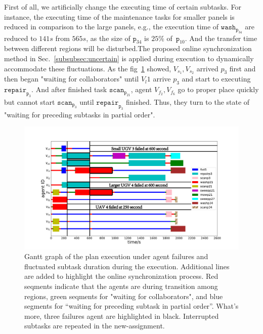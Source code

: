 First of all, we artificially change the executing time of certain subtasks.
For instance, the executing time of the maintenance tasks for smaller panels
is reduced in comparison to the large panels, e.g., the execution time
of $\texttt{wash}_{\texttt{p}_{34}}$ are reduced to $141s$ from $565s$, as the size
of $\texttt{p}_{34}$ is $25\%$ of~$\texttt{p}_{10}$. And the transfer time 
between different regions will be disturbed.The proposed online synchronization method in
 Sec.~\ref{subsubsec:uncertain} is applied during execution to dynamically accommodate these fluctuations.
As the fig~\ref{fig:online-failure-task} showed, $V_{s_1}, V_{s_2}$ arrived $p_3$ first
and then began "waiting for collaborators" until $V_l1$ arrive $p_3$ and start to executing
  $\texttt{repair}_{\texttt{p}_3}$. And after finished task $\texttt{scan}_{\texttt{p}_{21}}$,
  agent $V_{f_2},V_{f_6}$ go to proper place quickly but cannot start $\texttt{scan}_{\texttt{p}_3}$
  until $\texttt{repair}_{\texttt{p}_3}$ finished. Thus, they turn to the state of "waiting for preceding subtasks
  in partial order".



 
\begin{figure}[t]
	  \begin{minipage}[t]{1\linewidth}
		\includegraphics[height =0.6\textwidth]{figures/simulation/taskfinal/gantt_online_prefix.pdf}
	\end{minipage}%
	\centering
	\caption{
Gantt graph of the plan execution under agent failures and fluctuated subtask duration during the execution.
Additional lines are added to highlight the online synchronization process. Red seqments indicate that the agents
are during transition among regions, green seqments for "waiting for collaborators", and blue segments for 
“waiting for preceding subtask in partial order”. What's more, three failures agent are highlighted in black.
Interrupted subtasks are repeated in the new-assignment.
    }
        \label{fig:online-failure-task}
\end{figure}


